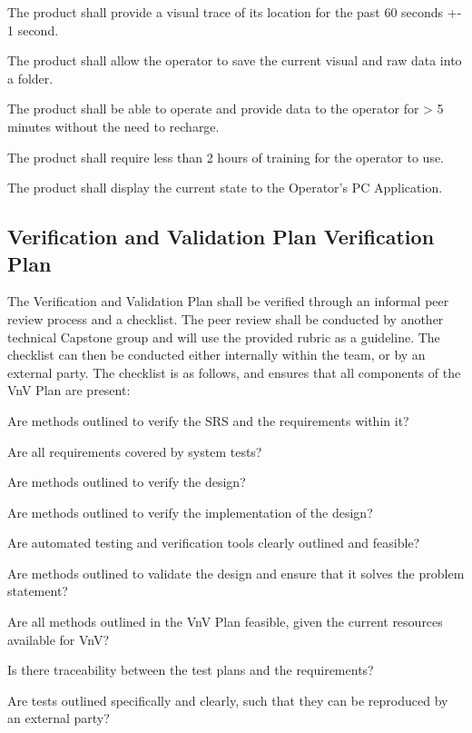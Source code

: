 \documentclass[12pt, titlepage]{article}
\begin{document}
\begin{todolist}
\begin{todolist}
    \item The product shall provide a visual trace of its location for the past 60 seconds +- 1 second.
    \item The product shall allow the operator to save the current visual and raw data into a folder.
    \item The product shall be able to operate and provide data to the operator for > 5 minutes without the need to recharge.
    \item The product shall require less than 2 hours of training for the operator to use.
    \item The product shall display the current state to the Operator's PC Application.
\end{todolist}
\end{todolist}

\subsection{Verification and Validation Plan Verification Plan}

The Verification and Validation Plan shall be verified through an informal peer review process and a checklist. The peer review shall be conducted by another technical Capstone group and will use the provided rubric as a guideline. The checklist can then be conducted either internally within the team, or by an external party. The checklist is as follows, and ensures that all components of the VnV Plan are present: 

\begin{todolist}
\label{VnV_Checklist}
\item Are methods outlined to verify the SRS and the requirements within it?
\begin{todolist}
    \item Are all requirements covered by system tests?
\end{todolist}
\item Are methods outlined to verify the design?
\item Are methods outlined to verify the implementation of the design?
\item Are automated testing and verification tools clearly outlined and feasible?
\item Are methods outlined to validate the design and ensure that it solves the problem statement?
\item Are all methods outlined in the VnV Plan feasible, given the current resources available for VnV?
\item Is there traceability between the test plans and the requirements?
\item Are tests outlined specifically and clearly, such that they can be reproduced by an external party?
\end{todolist}
\end{document}
